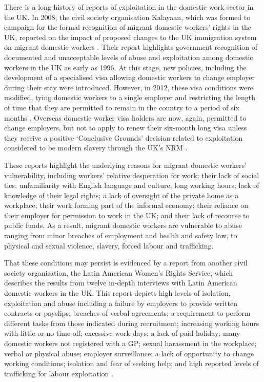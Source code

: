 \documentclass[
  12pt,
  letterpaper,
  DIV=11,
  numbers=noendperiod]{scrartcl}
\theoremstyle{plain}
\theoremstyle{definition}
\begin{document}
There is a long history of reports of exploitation in the domestic work
sector in the UK. In 2008, the civil society organisation Kalayaan,
which was formed to campaign for the formal recognition of migrant
domestic workers' rights in the UK, reported on the impact of proposed
changes to the UK immigration system on migrant domestic workers
\autocite{kalayaan_new_2008}. Their report highlights government
recognition of documented and unacceptable levels of abuse and
exploitation among domestic workers in the UK as early as 1996. At this
stage, new policies, including the development of a specialised visa
allowing domestic workers to change employer during their stay were
introduced. However, in 2012, these visa conditions were modified, tying
domestic workers to a single employer and restricting the length of time
that they are permitted to remain in the country to a period of six
months \autocite{gower_calls_2016}. Overseas domestic worker visa
holders are now, again, permitted to change employers, but not to apply
to renew their six-month long visa unless they receive a positive
`Conclusive Grounds' decision related to exploitation considered to be
modern slavery through the UK's NRM \autocite{romero_blueprint_2025}.

These reports highlight the underlying reasons for migrant domestic
workers' vulnerability, including workers' relative desperation for
work; their lack of social ties; unfamiliarity with English language and
culture; long working hours; lack of knowledge of their legal rights; a
lack of oversight of the private home as a workplace; their work forming
part of the informal economy; their reliance on their employer for
permission to work in the UK; and their lack of recourse to public
funds. As a result, migrant domestic workers are vulnerable to abuse
ranging from minor breaches of employment and health and safety law, to
physical and sexual violence, slavery, forced labour and trafficking.

That these conditions may persist is evidenced by a report from another
civil society organisation, the Latin American Women's Rights Service,
which describes the results from twelve in-depth interviews with Latin
American domestic workers in the UK. This report depicts high levels of
isolation, exploitation and abuse including a failure by employers to
provide written contracts or payslips; breaches of verbal agreements; a
requirement to perform different tasks from those indicated during
recruitment; increasing working hours with little or no time off;
excessive work days; a lack of paid holiday; many domestic workers not
registered with a GP; sexual harassment in the workplace; verbal or
physical abuse; employer surveillance; a lack of opportunity to change
working conditions; isolation and fear of seeking help; and high
reported levels of trafficking for labour exploitation
\autocite{latin_american_womens_rights_service_behind_2023}.
\end{document}
